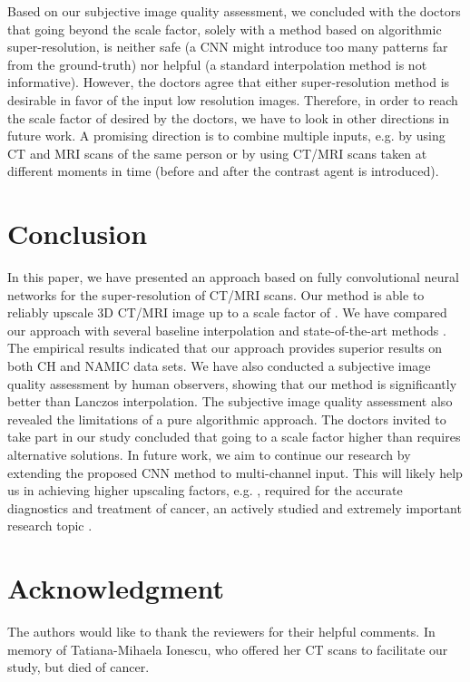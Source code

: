 \documentclass{ieeeaccess}
\begin{document}
Based on our subjective image quality assessment, we concluded with the doctors that going beyond the  scale factor, solely with a method based on algorithmic super-resolution, is neither safe (a CNN might introduce too many patterns far from the ground-truth) nor helpful (a standard interpolation method is not informative). However, the doctors agree that either super-resolution method is desirable in favor of the input low resolution images. Therefore, in order to reach the scale factor of  desired by the doctors, we have to look in other directions in future work. A promising direction is to combine multiple inputs, e.g. by using CT and MRI scans of the same person or by using CT/MRI scans taken at different moments in time (before and after the contrast agent is introduced).

\section{Conclusion}
\label{sec_Conclusion}

In this paper, we have presented an approach based on fully convolutional neural networks for the super-resolution of CT/MRI scans. Our method is able to reliably upscale 3D CT/MRI image up to a scale factor of . We have compared our approach with several baseline interpolation and state-of-the-art methods \cite{Du-AS-2019,Pham-CMIG-2019,You-TMI-2019,ZENG-CBM-2018}. The empirical results indicated that our approach provides superior results on both CH and NAMIC data sets. We have also conducted a subjective image quality assessment by human observers, showing that our method is significantly better than Lanczos interpolation. The subjective image quality assessment also revealed the limitations of a pure algorithmic approach. The doctors invited to take part in our study concluded that going to a scale factor higher than  requires alternative solutions. In future work, we aim to continue our research by extending the proposed CNN method to multi-channel input. This will likely help us in achieving higher upscaling factors, e.g. , required for the accurate diagnostics and treatment of cancer, an actively studied and extremely important research topic \cite{Popa-RRP-2014,Sardari-EBM-2010}.

\section*{Acknowledgment}
The authors would like to thank the reviewers for their helpful comments. In memory of Tatiana-Mihaela Ionescu, who offered her CT scans to facilitate our study, but died of cancer.



\ifCLASSOPTIONcaptionsoff
  \newpage
\fi














 












\EOD
\end{document}

